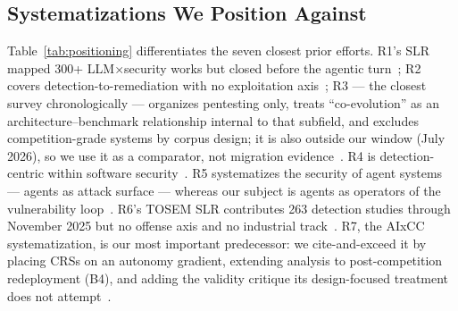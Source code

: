 \documentclass[conference,compsoc]{IEEEtran}
\begin{document}
\subsection{Systematizations We Position Against}
Table~\ref{tab:positioning} differentiates the seven closest prior efforts. R1's SLR mapped
300+ LLM$\times$security works but closed before the agentic turn~\cite{r1slr2024}; R2
covers detection-to-remediation with no exploitation axis~\cite{r2slr2024}; R3 ---
the closest survey chronologically --- organizes pentesting only, treats ``co-evolution'' as an
architecture--benchmark relationship internal to that subfield, and excludes competition-grade
systems by corpus design; it is also outside our window (July 2026), so we use it as a
comparator, not migration evidence~\cite{r3survey2026}. R4 is detection-centric within
software security~\cite{r4csur2025}. R5 systematizes the security of agent systems ---
agents as attack surface --- whereas our subject is agents as operators of the vulnerability
loop~\cite{r5usenix26agentic}. R6's TOSEM SLR contributes 263 detection studies through
November 2025 but no offense axis and no industrial track~\cite{r6tosem2026}. R7, the AIxCC
systematization, is our most important predecessor: we cite-and-exceed it by placing CRSs on
an autonomy gradient, extending analysis to post-competition redeployment (B4), and adding the
validity critique its design-focused treatment does not attempt~\cite{r7sokaixcc2026}.

\begin{table}[t]
\centering\scriptsize
\caption{Our comparative coding of prior systematizations. C=covered, P=partial, A=absent under the definitions used in this study.}
\label{tab:positioning}
\end{table}
\end{document}
